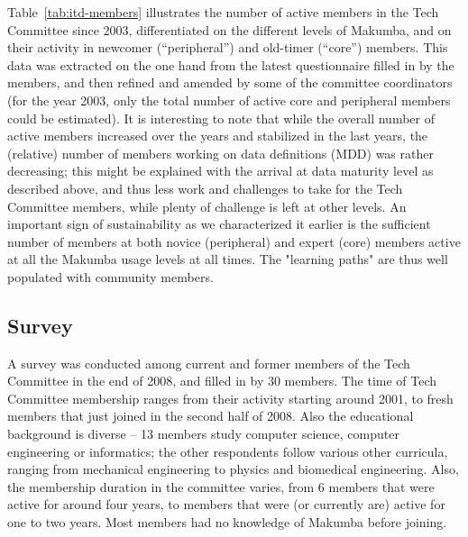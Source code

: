 \documentclass{llncs}
\begin{document}
Table~\ref{tab:itd-members} illustrates the number of active members in the Tech Committee since 2003, differentiated on the different levels of Makumba, and on their activity in newcomer (``peripheral'') and old-timer (``core'') members. This data was  extracted on the one hand from the latest questionnaire filled in by the members, and then refined and amended by some of the committee coordinators (for the year 2003, only the total number of active core and peripheral members could be estimated). It is interesting to note that while the overall number of active members increased over the years and stabilized in the last years, the (relative) number of members working on data definitions (MDD) was rather decreasing; this might be explained with the arrival at data maturity level as described above, and thus less work and challenges to take for the Tech Committee members, while plenty of challenge is left at other levels. An important sign of sustainability as we characterized it earlier is the sufficient number of members at both novice (peripheral) and expert (core) members active at all the Makumba usage levels at all times. The "learning paths" are thus well populated with community members.



\subsection{Survey}\label{sec:techCommittee-survey}
A survey was conducted among current and former members of the Tech Committee in the end of 2008, and filled in by 30 members. The time of Tech Committee membership ranges from their activity starting around 2001, to fresh members that just joined in the second half of 2008. Also the educational background is diverse -- 13 members study computer science, computer engineering or informatics; the other respondents follow various other curricula, ranging from mechanical engineering to physics and biomedical engineering. Also, the membership duration in the committee varies, from 6 members that were active for around four years, to members that were (or currently are) active for one to two years. Most members had no knowledge of Makumba before joining.
\end{document}
